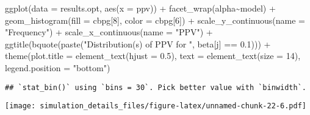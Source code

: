 \documentclass[
]{article}
\newenvironment{Shaded}{\begin{snugshade}}{\end{snugshade}}
\newcommand{\AttributeTok}[1]{\textcolor[rgb]{0.77,0.63,0.00}{#1}}
\newcommand{\DecValTok}[1]{\textcolor[rgb]{0.00,0.00,0.81}{#1}}
\newcommand{\FloatTok}[1]{\textcolor[rgb]{0.00,0.00,0.81}{#1}}
\newcommand{\FunctionTok}[1]{\textcolor[rgb]{0.00,0.00,0.00}{#1}}
\newcommand{\NormalTok}[1]{#1}
\newcommand{\SpecialCharTok}[1]{\textcolor[rgb]{0.00,0.00,0.00}{#1}}
\newcommand{\StringTok}[1]{\textcolor[rgb]{0.31,0.60,0.02}{#1}}
\begin{document}
\begin{Shaded}
\begin{Highlighting}[]
\FunctionTok{ggplot}\NormalTok{(}\AttributeTok{data =}\NormalTok{ results.opt,}
       \FunctionTok{aes}\NormalTok{(}\AttributeTok{x =}\NormalTok{ ppv)) }\SpecialCharTok{+}
  \FunctionTok{facet\_wrap}\NormalTok{(alpha}\SpecialCharTok{\textasciitilde{}}\NormalTok{model) }\SpecialCharTok{+}
  \FunctionTok{geom\_histogram}\NormalTok{(}\AttributeTok{fill =}\NormalTok{ cbpg[}\DecValTok{8}\NormalTok{], }\AttributeTok{color =}\NormalTok{ cbpg[}\DecValTok{6}\NormalTok{]) }\SpecialCharTok{+}
  \FunctionTok{scale\_y\_continuous}\NormalTok{(}\AttributeTok{name =} \StringTok{"Frequency"}\NormalTok{) }\SpecialCharTok{+}
  \FunctionTok{scale\_x\_continuous}\NormalTok{(}\AttributeTok{name =} \StringTok{"PPV"}\NormalTok{) }\SpecialCharTok{+}
  \FunctionTok{ggtitle}\NormalTok{(}\FunctionTok{bquote}\NormalTok{(}\FunctionTok{paste}\NormalTok{(}\StringTok{"Distribution(s) of PPV for "}\NormalTok{, beta[j] }\SpecialCharTok{==} \FloatTok{0.1}\NormalTok{))) }\SpecialCharTok{+}
  \FunctionTok{theme}\NormalTok{(}\AttributeTok{plot.title =} \FunctionTok{element\_text}\NormalTok{(}\AttributeTok{hjust =} \FloatTok{0.5}\NormalTok{), }
        \AttributeTok{text =} \FunctionTok{element\_text}\NormalTok{(}\AttributeTok{size =} \DecValTok{14}\NormalTok{),}
        \AttributeTok{legend.position =} \StringTok{"bottom"}\NormalTok{)}
\end{Highlighting}
\end{Shaded}

\begin{verbatim}
## `stat_bin()` using `bins = 30`. Pick better value with `binwidth`.
\end{verbatim}

\texttt{[image: simulation\_details\_files/figure-latex/unnamed-chunk-22-6.pdf]}
\end{document}
